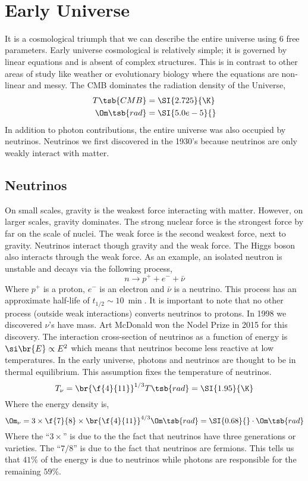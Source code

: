 \documentclass{article}
\begin{document}
\\

\section{Early Universe}

It is a cosmological triumph that we can describe the entire universe using $6$ free parameters. Early universe cosmological is relatively simple; it is governed by linear equations and is absent of complex structures. This is in contrast to other areas of study like weather or evolutionary biology where the equations are non-linear and messy. The CMB dominates the radiation density of the Universe,
\begin{align*}
    T\tsb{CMB} &= \SI{2.725}{\K}\\
    \Om\tsb{rad} &= \SI{5.0e-5}{}
\end{align*}
In addition to photon contributions, the entire universe was also occupied by neutrinos. Neutrinos we first discovered in the 1930's because neutrinos are only weakly interact with matter. \\

\subsection{Neutrinos}

On small scales, gravity is the weakest force interacting with matter. However, on larger scales, gravity dominates. The strong nuclear force is the strongest force by far on the scale of nuclei. The weak force is the second weakest force, next to gravity. Neutrinos interact though gravity and the weak force. The Higgs boson also interacts through the weak force. As an example, an isolated neutron is unstable and decays via the following process,
\[ n \to p^+ + e^- + \bar \nu \]
Where $p^+$ is a proton, $e^-$ is an electron and $\bar \nu$ is a neutrino. This process has an approximate half-life of $t_{1/2} \sim \SI{10}{\min}$. It is important to note that no other process (outside weak interactions) converts neutrinos to protons. In 1998 we discovered $\nu$'s have mass. Art McDonald won the Nodel Prize in 2015 for this discovery. The interaction cross-section of neutrinos as a function of energy is $\si\br{E} \propto E^2$ which means that neutrinos become less reactive at low temperatures. In the early universe, photons and neutrinos are thought to be in thermal equilibrium. This assumption fixes the temperature of neutrinos.
\[ T_{\nu} = \br{\f{4}{11}}^{1/3} T\tsb{rad} = \SI{1.95}{\K} \]
Where the energy density is,
\[ \Om_{\nu} = 3 \times \f{7}{8} \times \br{\f{4}{11}}^{4/3} \Om\tsb{rad} = \SI{0.68}{}\cdot\Om\tsb{rad} \]
Where the ``$3\times$'' is due to the the fact that neutrinos have three generations or varieties. The ``$7/8$'' is due to the fact that neutrinos are fermions. This tells us that $41\%$ of the energy is due to neutrinos while photons are responsible for the remaining $59\%$.\\
\end{document}
